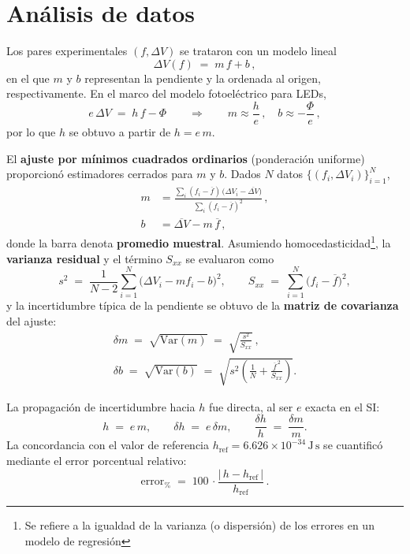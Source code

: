 \documentclass[11pt,twocolumn]{article}
\begin{document}
\section{Análisis de datos}

Los pares experimentales $(f,\Delta V)$ se trataron con un modelo lineal
\begin{equation*}
    \Delta V(f) \;=\; m\,f + b \,,
\end{equation*}
en el que $m$ y $b$ representan la pendiente y la ordenada al origen, respectivamente. En el marco del modelo fotoeléctrico para LEDs,
\begin{equation*}
    e\,\Delta V \;=\; h\,f - \Phi 
    \qquad\Longrightarrow\qquad
    m \approx \frac{h}{e}\,,\quad b \approx -\frac{\Phi}{e}\,,
\end{equation*}
por lo que $h$ se obtuvo a partir de $h = e\,m$.

El \textbf{ajuste por mínimos cuadrados ordinarios} (ponderación uniforme) proporcionó estimadores cerrados para $m$ y $b$. Dados $N$ datos $\{(f_i,\Delta V_i)\}_{i=1}^N$,
\begin{align*}
    m &= \frac{\sum_i (f_i-\overline{f})\,\big(\Delta V_i-\overline{\Delta V}\big)}
             {\sum_i (f_i-\overline{f})^2}\,,\\[4pt]
    b &= \overline{\Delta V} - m\,\overline{f}\,,
\end{align*}
donde la barra denota \textbf{promedio muestral}. Asumiendo homocedasticidad\footnote{Se refiere a la igualdad de la varianza (o dispersión) de los errores en un modelo de regresión}, la \textbf{varianza residual} y el término $S_{xx}$ se evaluaron como
\begin{equation*}
    s^2 \;=\; \frac{1}{N-2}\sum_{i=1}^{N}\!\big(\Delta V_i - m f_i - b\big)^2,
    \qquad
    S_{xx} \;=\; \sum_{i=1}^{N} \big(f_i - \overline{f}\big)^2,
\end{equation*}
y la incertidumbre típica de la pendiente se obtuvo de la \textbf{matriz de covarianza} del ajuste:
\begin{align*}
    \delta m \;=\; \sqrt{\mathrm{Var}(m)} \;=\; \sqrt{\frac{s^2}{S_{xx}}}\,,\\[4pt]
    \delta b \;=\; \sqrt{\mathrm{Var}(b)} \;=\; \sqrt{s^2\!\left(\frac{1}{N}+\frac{\overline{f}^{\,2}}{S_{xx}}\right)}.
\end{align*}

La propagación de incertidumbre hacia $h$ fue directa, al ser $e$ exacta en el SI:
\begin{equation*}
    h \;=\; e\,m,
    \qquad
    \delta h \;=\; e\,\delta m,
    \qquad
    \frac{\delta h}{h} \;=\; \frac{\delta m}{m}.
\end{equation*}
La concordancia con el valor de referencia \(h_{\mathrm{ref}}=6.626\times 10^{-34}\,\mathrm{J\,s}\) se cuantificó mediante el error porcentual relativo:
\begin{equation*}
    \mathrm{error}_{\%} \;=\; 100\,\cdot
    \frac{\big|\,h-h_{\mathrm{ref}}\,\big|}{h_{\mathrm{ref}}}\,.    
\end{equation*}
\end{document}
